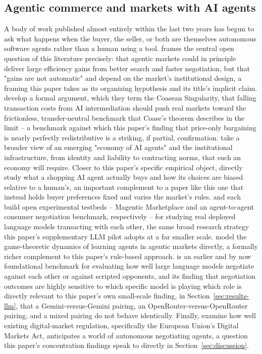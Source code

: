 \documentclass[review]{elsarticle}
\begin{document}
\subsection{Agentic commerce and markets with AI agents}
\label{sec:litreview-agentic}

A body of work published almost entirely within the last two years has begun to ask what happens when the buyer, the seller, or both are themselves autonomous software agents rather than a human using a tool. \citet{bichler2026agentic} frames the central open question of this literature precisely: that agentic markets could in principle deliver large efficiency gains from better search and faster negotiation, but that "gains are not automatic" and depend on the market's institutional design, a framing this paper takes as its organizing hypothesis and its title's implicit claim. \citet{shahidi2025coasean} develop a formal argument, which they term the Coasean Singularity, that falling transaction costs from AI intermediation should push real markets toward the frictionless, transfer-neutral benchmark that Coase's theorem describes in the limit -- a benchmark against which this paper's finding that price-only bargaining is nearly perfectly redistributive is a striking, if partial, confirmation. \citet{hadfield2025economy} take a broader view of an emerging "economy of AI agents" and the institutional infrastructure, from identity and liability to contracting norms, that such an economy will require. Closer to this paper's specific empirical object, \citet{allouah2026aiagent} directly study what a shopping AI agent actually buys and how its choices are biased relative to a human's, an important complement to a paper like this one that instead holds buyer preferences fixed and varies the market's rules. \citet{bansal2025magentic} and \citet{zhu2025automated} each build open experimental testbeds -- Magentic Marketplace and an agent-to-agent consumer negotiation benchmark, respectively -- for studying real deployed language models transacting with each other, the same broad research strategy this paper's supplementary LLM pilot adopts at a far smaller scale. \citet{bichler2025agenticgame} model the game-theoretic dynamics of learning agents in agentic markets directly, a formally richer complement to this paper's rule-based approach. \citet{bianchi2024negotiationarena} is an earlier and by now foundational benchmark for evaluating how well large language models negotiate against each other or against scripted opponents, and its finding that negotiation outcomes are highly sensitive to which specific model is playing which role is directly relevant to this paper's own small-scale finding, in Section~\ref{sec:results-llm}, that a Gemini-versus-Gemini pairing, an OpenRouter-versus-OpenRouter pairing, and a mixed pairing do not behave identically. Finally, \citet{bostoen2026futureproof} examine how well existing digital-market regulation, specifically the European Union's Digital Markets Act, anticipates a world of autonomous negotiating agents, a question this paper's concentration findings speak to directly in Section~\ref{sec:discussion}.
\end{document}
